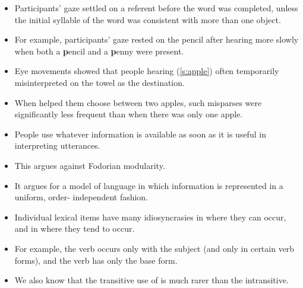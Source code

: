 \documentclass[a4paper,landscape,headrule,footrule]{foils}
\begin{document}


\begin{itemize}
\item Participants’ gaze settled on a referent before the 
word was completed, unless the initial syllable of the 
word was consistent with more than one object.  
\item For example, participants’ gaze rested on the pencil 
after hearing 
more slowly when both a \textbf{p}encil and a \textbf{p}enny were 
present.
\end{itemize}



\begin{itemize}
\item Eye movements showed that people hearing (\ref{s:apple}) often 
temporarily misinterpreted on the towel as the 
destination.
\begin{exe}
  \ex \label{s:apple} 
\end{exe}
\item When  helped them choose between two 
apples, such misparses were significantly less 
frequent than when there was only one apple.
\end{itemize}



\begin{itemize}
\item People use whatever information is available as 
soon as it is useful in interpreting utterances.
\item This argues against Fodorian modularity.
\item It argues for a model of language in which 
information is represented in a uniform, order-
independent fashion.
\end{itemize}


\begin{itemize}
\item Individual lexical items have many idiosyncrasies in 
where they can occur, and in where they tend to 
occur.  
\item For example, the verb  occurs only with the 
subject  (and only in certain verb forms), and the 
verb  has only the base form.
\item We also know that the transitive use of  is much 
rarer than the intransitive. 
\end{itemize}
\end{document}
